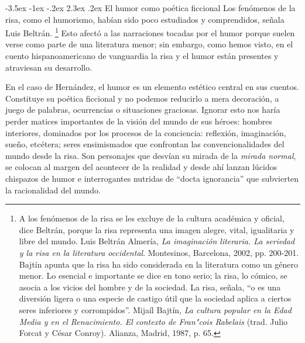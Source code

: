 \documentclass[14pt,twoside,final]{extbook} %
\makeatletter
\let\oldfootnote\footnote
\renewcommand\footnote[1]{%
\oldfootnote{\hspace{1mm}#1}}
\renewcommand\section{\@startsection {section}{1}{\z@}%
                                     {-3.5ex \@plus -1ex \@minus -.2ex}%
                                     {2.3ex \@plus .2ex}%
                                     {\normalfont\large\bfseries\sc}}
\makeatother
\begin{document}
\section{El humor como poética ficcional}\label{sec:el-humor-como-poetica-ficcional}
Los fenómenos de la risa, como el humorismo, habían sido poco estudiados y comprendidos, señala Luis Beltrán.\footnote{A los fenómenos de la risa se les excluye de la cultura académica y oficial, dice Beltrán, porque la risa representa una imagen alegre, vital, igualitaria y libre del mundo. Luis Beltrán Almería, \emph{La imaginación literaria. La seriedad y la risa en la literatura occidental}. Montesinos, Barcelona, 2002, pp. 200-201. Bajtín apunta que la risa ha sido considerada en la literatura como un género menor. Lo esencial e importante se dice en tono serio; la risa, lo cómico, se asocia a los vicios del hombre y de la sociedad. La risa, señala, ``o es una diversión ligera o una especie de castigo útil que la sociedad aplica a ciertos seres inferiores y corrompidos''.  Mijaíl Bajtín, \emph{La cultura popular en la Edad Media y en el Renacimiento. El contexto de Fran"cois Rabelais} (trad. Julio Forcat y César Conroy). Alianza, Madrid, 1987, p. 65.} Esto afectó a las narraciones tocadas por el humor porque suelen verse como parte de una literatura menor; sin embargo, como hemos visto, en el cuento hispanoamericano de vanguardia la risa y el humor están presentes y atraviesan su desarrollo.

En el caso de Hernández, el humor es un elemento estético central en sus cuentos. Constituye su poética ficcional y no podemos reducirlo a mera decoración, a juego de palabras, ocurrencias o situaciones graciosas. Ignorar esto nos haría perder matices importantes de la visión del mundo de sus héroes: hombres interiores, dominados por los procesos de la conciencia: reflexión, imaginación, sueño, etcétera; seres ensimismados que confrontan las convencionalidades del mundo desde la risa. Son personajes que desvían su mirada de la \emph{mirada normal}, se colocan al margen del acontecer de la realidad y desde ahí lanzan lúcidos chispazos de humor e interrogantes nutridas de ``docta ignorancia'' que subvierten la racionalidad del mundo.
\end{document}
